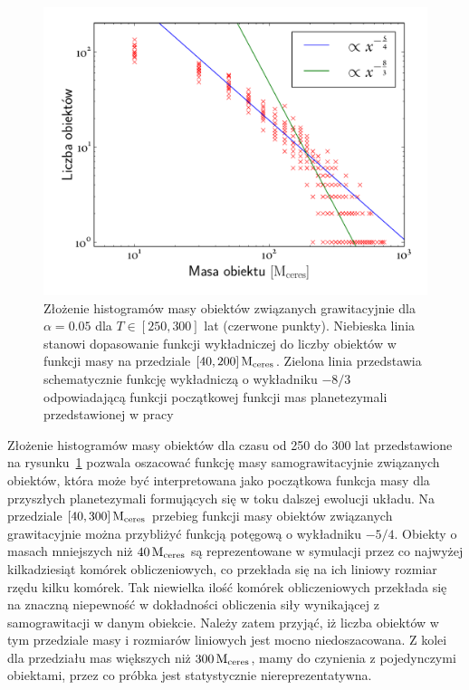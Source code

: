 \begin{figure}[ht]
   \centering
   \includegraphics[width=0.7\linewidth]{figures/mass_func}
   \caption{Złożenie histogramów masy obiektów związanych grawitacyjnie dla
   $\alpha = 0.05$ dla $T \in [250, 300]$ lat (czerwone punkty). Niebieska linia
stanowi dopasowanie funkcji wykładniczej do liczby obiektów w funkcji masy na
przedziale $[40,200]\hbox{$\mathrm{\thinspace M_{\textrm{ceres}}}$}$. Zielona linia przedstawia schematycznie funkcję
wykładniczą o wykładniku $-8/3$ odpowiadającą funkcji początkowej funkcji mas
planetezymali przedstawionej w pracy~\cite{MFFK98}}
   \label{fig:massfun}
\end{figure}
%
\par Złożenie histogramów masy obiektów dla czasu od 250 do 300 lat
przedstawione na rysunku~\ref{fig:massfun} pozwala oszacować funkcję masy
samograwitacyjnie związanych obiektów, która może być interpretowana jako
początkowa funkcja masy dla przyszłych planetezymali formujących się w toku
dalszej ewolucji układu. Na przedziale $[40, 300]\hbox{$\mathrm{\thinspace M_{\textrm{ceres}}}$}$ przebieg funkcji masy
obiektów związanych grawitacyjnie można przybliżyć funkcją potęgową o wykładniku
$-5/4$. Obiekty o masach mniejszych niż $40\hbox{$\mathrm{\thinspace M_{\textrm{ceres}}}$}$ są reprezentowane w
symulacji przez co najwyżej kilkadziesiąt komórek obliczeniowych, co przekłada
się na ich liniowy rozmiar rzędu kilku komórek. Tak niewielka ilość komórek
obliczeniowych przekłada się na znaczną niepewność w dokładności obliczenia
siły wynikającej z samograwitacji w danym obiekcie. Należy zatem przyjąć, iż
liczba obiektów w tym przedziale masy i rozmiarów liniowych jest mocno
niedoszacowana. Z kolei dla przedziału mas większych niż $300\hbox{$\mathrm{\thinspace M_{\textrm{ceres}}}$}$, mamy
do czynienia z pojedynczymi obiektami, przez co próbka jest statystycznie
niereprezentatywna.
%

